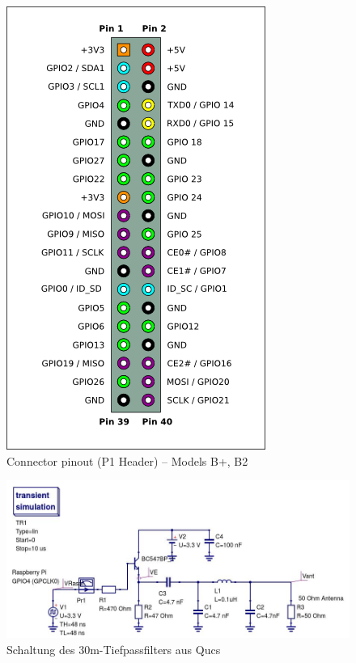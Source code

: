 \begin{figure}[H]
    \includegraphics[height=0.4\textheight]{Schwingkreis/Bilder/Pi-GPIO-header.png}
    \caption{Connector pinout (P1 Header) -- Models B+, B2}
    \label{fig:rpi}
\end{figure}

\begin{figure}[H]
    \centering
    \includegraphics[width=1\textwidth]{Schwingkreis/Bilder/30mRaspiAmpLP.jpg}
    \caption{Schaltung des 30m-Tiefpassfilters aus Qucs}
    \label{fig:30mLP}
\end{figure}



